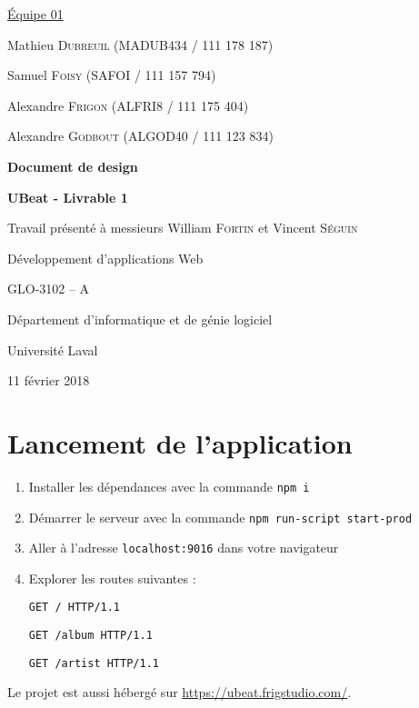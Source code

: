 \documentclass[12pt, letterpaper]{article}
\begin{document}
	\begin{titlepage}
        {\setlength{\parindent}{0pt}
            \underline{Équipe 01} \par
            Mathieu \textsc{Dubreuil} (MADUB434 / 111 178 187) \par
            Samuel \textsc{Foisy} (SAFOI / 111 157 794) \par
            Alexandre \textsc{Frigon} (ALFRI8 / 111 175 404) \par
            Alexandre \textsc{Godbout} (ALGOD40 / 111 123 834) \par
        }

        \begin{center}
            \vspace{4cm}
            {\Large\textbf{Document de design} \par}
            {\large\textbf{UBeat - Livrable 1} \par}

            \vspace{2cm}
            {\large Travail présenté à messieurs William \textsc{Fortin} et Vincent \textsc{Séguin} \par}

            \vspace{1.25cm}
            {\large
            	Développement d'applications Web \par
            	GLO-3102 -- A \par
            }

            \vfill
            Département d’informatique et de génie logiciel \par
            Université Laval \par
            11 février 2018 \par
        \end{center}
    \end{titlepage}
    
    \section*{Lancement de l'application}

    \begin{enumerate}
    	\item Installer les dépendances avec la commande \verb|npm i|
    	\item Démarrer le serveur avec la commande \verb|npm run-script start-prod|
        \item Aller à l'adresse \verb|localhost:9016| dans votre navigateur
        \item Explorer les routes suivantes : \par
        \verb|GET / HTTP/1.1| \par
        \verb|GET /album HTTP/1.1| \par
        \verb|GET /artist HTTP/1.1| \par
    \end{enumerate}

	\bigskip

    Le projet est aussi hébergé sur \url{https://ubeat.frigstudio.com/}.
\end{document}
